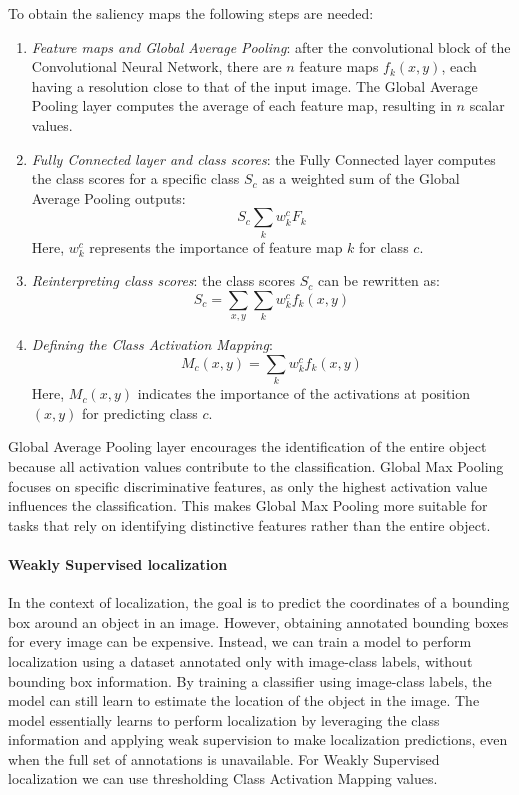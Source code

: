 To obtain the saliency maps the following steps are needed: 
\begin{enumerate}
    \item \textit{Feature maps and Global Average Pooling}: after the convolutional block of the Convolutional Neural Network, there are $n$ feature maps $f_k(x,y)$, each having a resolution close to that of the input image.
        The Global Average Pooling layer computes the average of each feature map, resulting in $n$ scalar values. 
    \item \textit{Fully Connected layer and class scores}: the Fully Connected layer computes the class scores for a specific class $S_c$ as a weighted sum of the Global Average Pooling outputs:
        \[S_c\sum_{k}w_k^cF_k\]
        Here, $w^c_k$ represents the importance of feature map $k$ for class $c$.
    \item \textit{Reinterpreting class scores}: the class scores $S_c$ can be rewritten as:
        \[S_c=\sum_{x,y}\sum_kw_k^cf_k(x,y)\]
    \item \textit{Defining the Class Activation Mapping}: 
        \[M_c(x,y)=\sum_kw_k^cf_k(x,y)\]
        Here, $M_c(x,y)$ indicates the importance of the activations at position $(x,y)$ for predicting class $c$. 
\end{enumerate}
Global Average Pooling layer encourages the identification of the entire object because all activation values contribute to the classification.
Global Max Pooling focuses on specific discriminative features, as only the highest activation value influences the classification. 
This makes Global Max Pooling more suitable for tasks that rely on identifying distinctive features rather than the entire object.

\paragraph*{Weakly Supervised localization}
In the context of localization, the goal is to predict the coordinates of a bounding box around an object in an image. 
However, obtaining annotated bounding boxes for every image can be expensive.
Instead, we can train a model to perform localization using a dataset annotated only with image-class labels, without bounding box information.
By training a classifier using image-class labels, the model can still learn to estimate the location of the object in the image. 
The model essentially learns to perform localization by leveraging the class information and applying weak supervision to make localization predictions, even when the full set of annotations is unavailable.
For Weakly Supervised localization we can use thresholding Class Activation Mapping values. 

